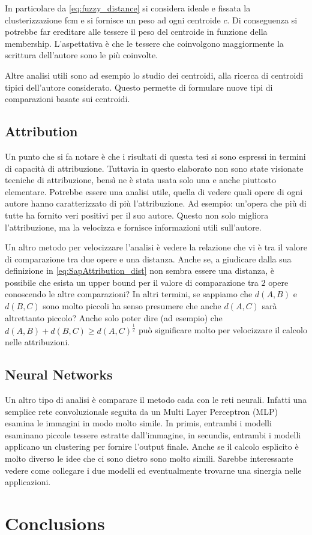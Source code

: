 \noindent In particolare da \cref{eq:fuzzy_distance} si considera ideale e fissata la clusterizzazione \gls{fcm} e si fornisce un peso ad ogni centroide $c$. Di conseguenza si potrebbe far ereditare alle tessere il peso del centroide in funzione della membership. L'aspettativa è che le tessere che coinvolgono maggiormente la scrittura dell'autore sono le più coinvolte.

\noindent Altre analisi utili sono ad esempio lo studio dei centroidi, alla ricerca di centroidi tipici dell'autore considerato. Questo permette di formulare nuove tipi di comparazioni basate sui centroidi.

\subsection{Attribution}
Un punto che si fa notare è che i risultati di questa tesi si sono espressi in termini di capacità di attribuzione. Tuttavia in questo elaborato non sono state visionate tecniche di attribuzione, bensì ne è stata usata solo una e anche piuttosto elementare. Potrebbe essere una analisi utile, quella di vedere quali opere di ogni autore hanno caratterizzato di più l'attribuzione. Ad esempio: un'opera che più di tutte ha fornito veri positivi per il suo autore. Questo non solo migliora l'attribuzione, ma la velocizza e fornisce informazioni utili sull'autore.

\noindent Un altro metodo per velocizzare l'analisi è vedere la relazione che vi è tra il valore di comparazione tra due opere e una distanza. Anche se, a giudicare dalla sua definizione in \cref{eq:SapAttribution_dist} non sembra essere una distanza, è possibile che esista un upper bound per il valore di comparazione tra $2$ opere conoscendo le altre comparazioni? In altri termini, se sappiamo che $d(A,B)$ e $d(B,C)$ sono molto piccoli ha senso presumere che anche $d(A,C)$ sarà altrettanto piccolo? Anche solo poter dire (ad esempio) che $d(A,B)+d(B,C) \geq d(A,C)^\frac12$ può significare molto per velocizzare il calcolo nelle attribuzioni.

\subsection{Neural Networks}
Un altro tipo di analisi è comparare il metodo \gls{cada} con le reti neurali. Infatti una semplice rete convoluzionale seguita da un Multi Layer Perceptron (MLP) esamina le immagini in modo molto simile. In primis, entrambi i modelli esaminano piccole tessere estratte dall'immagine, in secundis, entrambi i modelli applicano un clustering per fornire l'output finale. Anche se il calcolo esplicito è molto diverso le idee che ci sono dietro sono molto simili. Sarebbe interessante vedere come collegare i due modelli ed eventualmente trovarne una sinergia nelle applicazioni.

\section{Conclusions}
